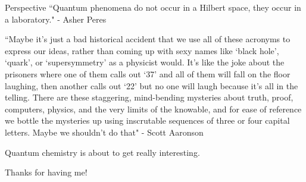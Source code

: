 \documentclass[10pt]{beamer}
\begin{document}
\begin{frame}{Perspective}%
    ``Quantum phenomena do not occur in a Hilbert space, they occur in a laboratory." - Asher Peres
    
   ``Maybe it's just a bad historical accident that we use all of these acronyms to express our ideas, rather than coming up with sexy names like `black hole', `quark', or `supersymmetry' as a physicist would. It's like the joke about the prisoners where one of them calls out `37' and all of them will fall on the floor laughing, then another calls out `22' but no one will laugh because it's all in the telling. There are these staggering, mind-bending mysteries about truth, proof, computers, physics, and the very limits of the knowable, and for ease of reference we bottle the mysteries up using inscrutable sequences of three or four capital letters. Maybe we shouldn't do that" - Scott Aaronson
    
    Quantum chemistry is about to get really interesting.
\end{frame}

\begin{frame}{}
    \begin{center}
        Thanks for having me!
    \end{center}
\end{frame}

\section{}





\end{document}
